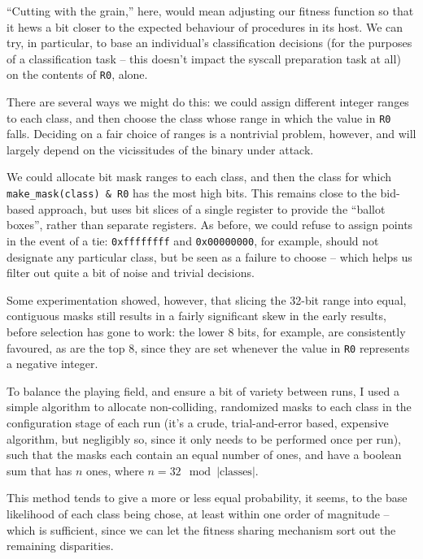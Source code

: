 \documentclass[12pt,glossary]{dalthesis}
\begin{document}
``Cutting with the grain,'' here, would mean adjusting our fitness function so that it hews a bit
closer to the expected behaviour of procedures in its host. We can try, in particular, to base
an individual's classification decisions (for the purposes of a classification task -- this doesn't
impact the syscall preparation task at all) on the contents of \texttt{R0}, alone. 

There are several ways we might do this: we could assign different integer ranges to each
class, and then choose the class whose range in which the value in \texttt{R0} falls. Deciding on 
a fair choice of ranges is a nontrivial problem, however, and will largely depend on the
vicissitudes of the binary under attack. 

We could allocate bit mask ranges to each class, and then the class for which \texttt{make\_mask(class) \& R0} 
has the most high bits. This remains close to the bid-based approach, but uses bit slices of a single
register to provide the ``ballot boxes'', rather than separate registers. As before, we could refuse
to assign points in the event of a tie: \texttt{0xffffffff} and \texttt{0x00000000}, for example,
should not designate any particular class, but be seen as a failure to choose -- which helps us
filter out quite a bit of noise and trivial decisions.  

Some experimentation showed, however, that slicing the 32-bit range into equal, contiguous
masks still results in a fairly significant skew in the early results, before selection has
gone to work: the lower 8 bits, for example, are consistently favoured, as are the top 8, since
they are set whenever the value in \texttt{R0} represents a negative integer. 

To balance the playing field, and ensure a bit of variety between runs, I used a simple algorithm
to allocate non-colliding, randomized masks to each class in the configuration stage of each run
(it's a crude, trial-and-error based, expensive algorithm, but negligibly so,
since it only needs to be performed once per run), such that the masks each contain an equal number
of ones, and have a boolean sum that has \(n\) ones, where \(n = 32 \mod |\text{classes}|\).

This method tends to give a more or less equal probability, it seems, to the base likelihood
of each class being chose, at least within one order of magnitude -- which is
sufficient, since we can let the fitness sharing mechanism sort out the
remaining disparities.
\end{document}
